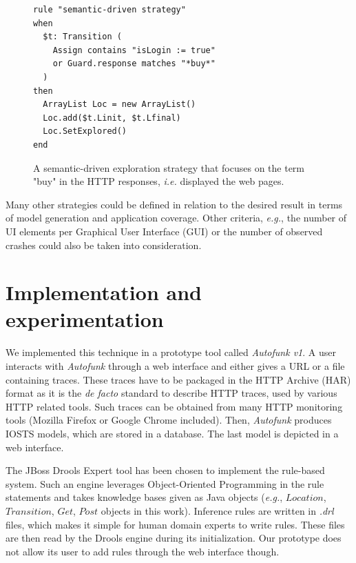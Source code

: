 \begin{figure}[h]
\begin{framed}
\begin{BVerbatim}
rule "semantic-driven strategy"
when
  $t: Transition (
    Assign contains "isLogin := true"
    or Guard.response matches "*buy*"
  )
then
  ArrayList Loc = new ArrayList()
  Loc.add($t.Linit, $t.Lfinal)
  Loc.SetExplored()
end
\end{BVerbatim}
\end{framed}

\caption{A semantic-driven exploration strategy that focuses on
the term "buy" in the HTTP responses, \emph{i.e.} displayed the web
pages.}
\label{fig:rule:semdriven}
\end{figure}

Many other strategies could be defined in relation to the desired
result in terms of model generation and application coverage.
Other criteria, \emph{e.g.}, the number of UI elements per Graphical User
Interface (GUI) or the number of observed crashes could also be
taken into consideration.


\section{Implementation and experimentation}
\label{sec:modelinf:webapps:exp}

We implemented this technique in a prototype tool called
\textit{Autofunk v1}. A user interacts with \textit{Autofunk}
through a web interface and either gives a URL or a file
containing traces.  These traces have to be packaged in the HTTP
Archive (HAR) format as it is the \emph{de facto} standard to describe
HTTP traces, used by various HTTP related tools. Such traces can
be obtained from many HTTP monitoring tools (Mozilla Firefox or
Google Chrome included).  Then, \textit{Autofunk} produces IOSTS
models, which are stored in a database. The last model is
depicted in a web interface.

The JBoss Drools Expert tool has been chosen to implement the
rule-based system. Such an engine leverages Object-Oriented
Programming in the rule statements and takes knowledge bases
given as Java objects (\emph{e.g.}, $Location$, $Transition$,
$Get$, $Post$ objects in this work). Inference rules are written
in \emph{.drl} files, which makes it simple for human domain
experts to write rules. These files are then read by the Drools
engine during its initialization. Our prototype does not allow
its user to add rules through the web interface though.

